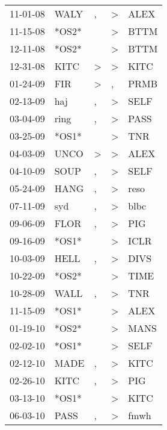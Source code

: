 \begin{supertabular}{lllll}
 11-01-08 &   WALY &                , &     \textgreater &   ALEX \\
 11-15-08 &  *OS2* &                  &     \textgreater &   BTTM \\
 12-11-08 &  *OS2* &                  &     \textgreater &   BTTM \\
 12-31-08 &   KITC &     \textgreater &     \textgreater &   KITC \\
 01-24-09 &    FIR &     \textgreater &                , &   PRMB \\
 02-13-09 &    haj &                , &     \textgreater &   SELF \\
 03-04-09 &   ring &                , &     \textgreater &   PASS \\
 03-25-09 &  *OS1* &                  &     \textgreater &    TNR \\
 04-03-09 &   UNCO &     \textgreater &     \textgreater &   ALEX \\
 04-10-09 &   SOUP &                , &     \textgreater &   SELF \\
 05-24-09 &   HANG &                , &     \textgreater &   reso \\
 07-11-09 &    syd &                , &     \textgreater &   blbc \\
 09-06-09 &   FLOR &                , &     \textgreater &    PIG \\
 09-16-09 &  *OS1* &                  &     \textgreater &   ICLR \\
 10-03-09 &   HELL &                , &     \textgreater &   DIVS \\
 10-22-09 &  *OS2* &                  &     \textgreater &   TIME \\
 10-28-09 &   WALL &                , &     \textgreater &    TNR \\
 11-15-09 &  *OS1* &                  &     \textgreater &   ALEX \\
 01-19-10 &  *OS2* &                  &     \textgreater &   MANS \\
 02-02-10 &  *OS1* &                  &     \textgreater &   SELF \\
 02-12-10 &   MADE &                , &     \textgreater &   KITC \\
 02-26-10 &   KITC &                , &     \textgreater &    PIG \\
 03-13-10 &  *OS1* &                  &     \textgreater &   KITC \\
 06-03-10 &   PASS &                , &     \textgreater &   fmwh \\

\end{supertabular}

